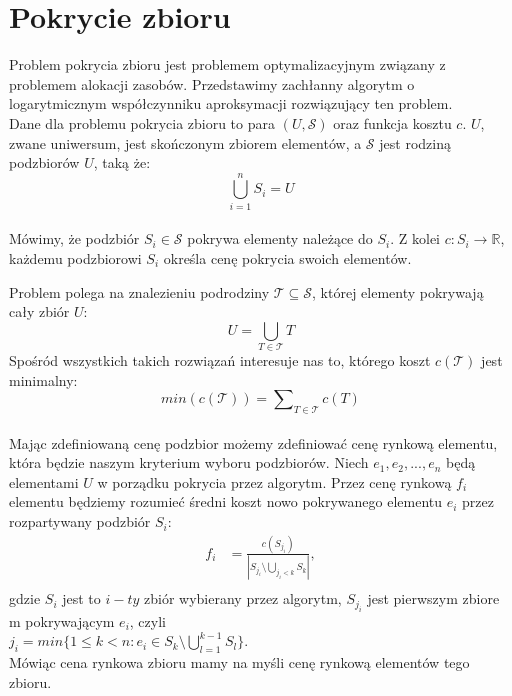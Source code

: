 \section{Pokrycie zbioru}


Problem pokrycia zbioru jest problemem optymalizacyjnym związany z problemem alokacji zasobów. 
Przedstawimy zachłanny algorytm o logarytmicznym współczynniku aproksymacji rozwiązujący ten problem.\\


Dane dla problemu pokrycia zbioru to para $(U,\mathcal{S})$ oraz funkcja kosztu $c$. $U$, zwane uniwersum, jest skończonym zbiorem elementów, a $\mathcal{S}$ jest rodziną podzbiorów $U$, taką że:\\
\[ \bigcup\limits_{i=1}^{n} S_{i} = U \] \\
Mówimy, że podzbiór $S_{i} \in \mathcal{S}$ pokrywa elementy należące do $S_{i}$. 
Z kolei $c: S_{i} \rightarrow \mathbb{R} $, każdemu podzbiorowi $S_{i}$ określa cenę pokrycia swoich elementów.

Problem polega na znalezieniu podrodziny $\mathcal{T} \subseteq \mathcal{S}$, której elementy pokrywają cały zbiór $U$:
\[ U = \bigcup_{T \in \mathcal{T}} T \]  
Spośród wszystkich takich rozwiązań interesuje nas to, którego koszt $c(\mathcal{T})$ jest minimalny: \[ min(c(\mathcal{T})) = \sum\nolimits_{T \in \mathcal{T}} c(T) \]  \\


Mając zdefiniowaną cenę podzbior możemy zdefiniować cenę rynkową elementu, która będzie naszym kryterium wyboru podzbiorów.
Niech $e_{1}, e_{2}, ... , e_{n}$ będą elementami $U$ w porządku pokrycia przez algorytm.
Przez cenę rynkową $f_{i}$ elementu będziemy rozumieć średni koszt nowo pokrywanego elementu $e_{i}$ przez rozpartywany podzbiór $S_{i}$: \\
\begin{align*}
f_{i} &= \frac{c(S_{j_i})}{\left|S_{j_i} \setminus \bigcup_{j_{i} < k} S_{k} \right|},\\
\end{align*}
gdzie $S_{i}$ jest to $i-ty$ zbiór wybierany przez algorytm, $S_{j_i}$ jest pierwszym zbiore m pokrywającym $e_{i}$, czyli\\ $j_{i} = min \bigg\{ 1 \leq k < n : e_i \in S_k \setminus \bigcup\limits_{l=1}^{k-1} S_{l}  \bigg\}$.\\
Mówiąc cena rynkowa zbioru mamy na myśli cenę rynkową elementów tego zbioru.\\


